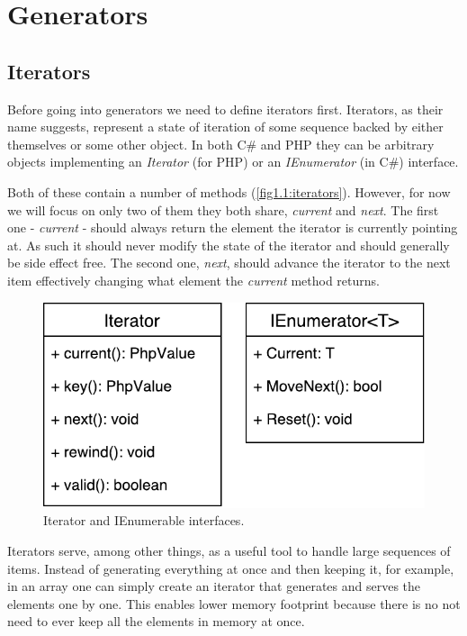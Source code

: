\chapter{Generators}
\section{Iterators}
Before going into generators we need to define iterators first. Iterators, as their name suggests, represent a state of iteration of some sequence backed by either themselves or some other object. In both C\# and PHP they can be arbitrary objects implementing an \emph{Iterator} (for PHP) or an \emph{IEnumerator} (in C\#) interface. 

Both of these contain a number of methods  (\autoref{fig1.1:iterators}). However, for now we will focus on only two of them they both share, \emph{current} and \emph{next}. The first one - \emph{current} - should always return the element the iterator is currently pointing at. As such it should never modify the state of the iterator and should generally be side effect free. The second one, \emph{next}, should advance the iterator to the next item effectively changing what element the \emph{current} method returns.

\begin{figure}[h]	
	\centering	
	\includegraphics[scale=0.75]{../img/1_1_iterators}	
	\caption{Iterator and IEnumerable interfaces.}
	\label{fig1.1:iterators}
\end{figure}

Iterators serve, among other things, as a useful tool to handle large sequences of items. Instead of generating everything at once and then keeping it, for example, in an array one can simply create an iterator that generates and serves the elements one by one. This enables lower memory footprint because there is no not need to ever keep all the elements in memory at once. 

